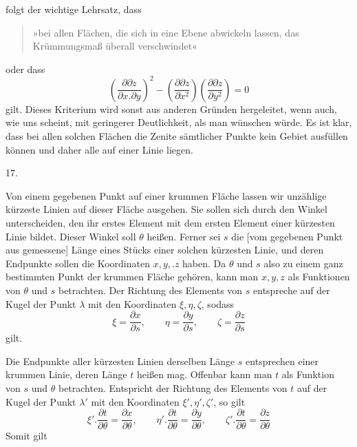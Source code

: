 %
folgt der wichtige Lehrsatz, dass
\begin{quote}
»bei allen Flächen, die sich in eine Ebene abwickeln lassen, das Krümmungsmaß überall verschwindet«
\end{quote}
\noindent oder dass
\[
\left(\frac{\partial\partial z}{\partial x.\partial y}\right)^{2}-\left(\frac{\partial\partial z}{\partial x^{2}}\right)\left(\frac{\partial\partial z}{\partial y^{2}}\right)=0
\]
gilt. Dieses Kriterium wird sonst aus anderen Gründen hergeleitet, wenn auch, wie uns scheint, mit geringerer Deutlichkeit, als man wünschen würde. Es ist klar, dass bei allen solchen Flächen die Zenite sämtlicher Punkte kein Gebiet ausfüllen können und daher alle auf einer Linie liegen.

\begin{center}17.\end{center}
\noindent\hspace*{1.2em}Von einem gegebenen Punkt auf einer krummen Fläche lassen wir unzählige kürzeste Linien auf dieser Fläche ausgehen. Sie sollen sich durch den Winkel unterscheiden, den ihr erstes Element mit dem ersten Element einer  kürzesten Linie bildet. Dieser Winkel soll $\theta$ heißen. Ferner sei $s$ die [vom gegebenen Punkt aus gemessene] Länge eines Stücks einer solchen kürzesten Linie, und deren Endpunkte sollen die Koordinaten $x,y,.z$ haben. Da $\theta$ und $s$ also zu einem ganz bestimmten Punkt der krummen Fläche gehören, kann man $x,y,z$ als Funktionen von $\theta$ und $s$ betrachten. Der Richtung des Elements von $s$ entspreche auf der Kugel der Punkt $\lambda$ mit den Koordinaten $\xi,\eta,\zeta$, sodass
\[
\xi=\frac{\partial x}{\partial s},\qquad\eta=\frac{\partial y}{\partial s},\qquad\zeta=\frac{\partial z}{\partial s}
\]
gilt.

Die Endpunkte aller kürzesten Linien derselben Länge $s$ entsprechen einer krummen Linie, deren Länge $t$ heißen mag. Offenbar kann man $t$ als Funktion von $s$ und $\theta$ betrachten. Entspricht der Richtung des Elements von $t$ auf der Kugel der Punkt $\lambda'$ mit den Koordinaten $\xi',\eta',\zeta'$, so gilt
\[
\xi'.\frac{\partial t}{\partial\theta}=\frac{\partial x}{\partial\theta},\qquad\eta'.\frac{\partial t}{\partial\theta}=\frac{\partial y}{\partial\theta},\qquad\zeta'.\frac{\partial t}{\partial\theta}=\frac{\partial z}{\partial\theta}
\]
Somit gilt
